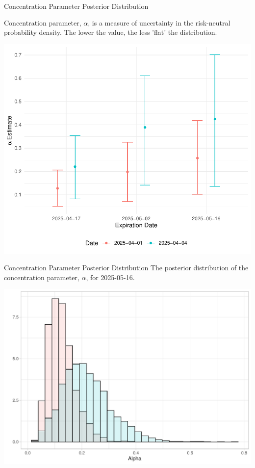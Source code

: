 \documentclass[10pt,aspectratio=43]{beamer}
\begin{document}
\begin{frame}{Concentration Parameter Posterior Distribution}

    Concentration parameter, $\alpha$, is a measure of uncertainty in the risk-neutral probability density. The lower the value, the less 'flat' the distribution.

    \begin{center}
            \includegraphics[scale=0.5]{alphas.pdf}
    \end{center}
\end{frame}

\begin{frame}{Concentration Parameter Posterior Distribution}
    \centering
    The posterior distribution of the concentration parameter, $\alpha$, for 2025-05-16.

    \includegraphics[width=0.8\linewidth]{alpha_histogram.pdf}
\end{frame}
\end{document}
